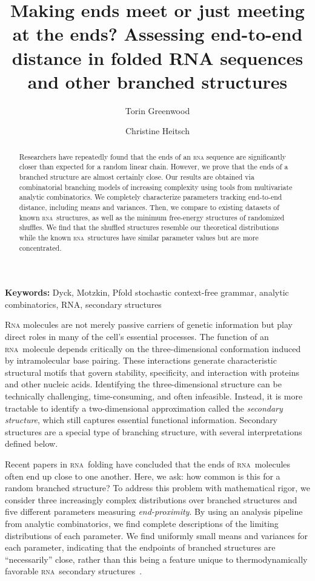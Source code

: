 \documentclass{article}
\title{Making ends meet or just meeting at the ends?  Assessing end-to-end distance in folded RNA sequences and other branched structures}
\author[1]{Torin Greenwood}
\author[2]{Christine Heitsch}
\affil[1]{Department of Mathematics, North Dakota State University, Fargo, ND 58102, USA}
\affil[2]{School of Mathematics, Georgia Institute of Technology, Atlanta, GA 30332, USA}
\date{}
\newcommand{\RNA}{\textsc{rna}}
\newcommand{\rna}{\textsc{rna}}
\newcommand{\keywords}[1]{%
  \par\medskip\noindent\textbf{Keywords:} #1\par\medskip
}
\begin{document}
\maketitle

\begin{abstract}
Researchers have repeatedly found that the ends of an \textsc{rna} sequence are significantly closer than expected for a random linear chain.  However, we prove that the ends of a branched structure are almost certainly close.  Our results are obtained via combinatorial branching models of increasing complexity using tools from multivariate analytic combinatorics.  We completely characterize parameters tracking end-to-end distance, including means and variances.  Then, we compare to existing datasets of known \rna\ structures, as well as the minimum free-energy structures of randomized shuffles.  We find that the shuffled structures resemble our theoretical distributions while the known \rna\ structures have similar parameter values but are more concentrated.
\end{abstract}

\keywords{Dyck, Motzkin, Pfold stochastic context-free grammar, analytic combinatorics, RNA, secondary structures}


\textsc{Rna} molecules are not merely passive carriers of genetic information but play direct roles in many of the cell’s essential processes. The function of an \RNA\ molecule depends critically on the three-dimensional conformation induced by intramolecular base pairing.  These interactions generate characteristic structural motifs that govern stability, specificity, and interaction with proteins and other nucleic acids.  Identifying the three-dimensional structure can be technically challenging, time-consuming, and often infeasible.  Instead, it is more tractable to identify a two-dimensional approximation called the \emph{secondary structure}, which still captures essential functional information.  Secondary structures are a special type of branching structure, with several interpretations defined below.  

Recent papers in \rna\ folding have concluded that the ends of \rna\ molecules often end up close to one another.  Here, we ask: how common is this for a random branched structure?  To address this problem with mathematical rigor, we consider three increasingly complex distributions over branched structures and five different parameters measuring \emph{end-proximity}.  By using an analysis pipeline from analytic combinatorics, we find complete descriptions of the limiting distributions of each parameter.  We find uniformly small means and variances for each parameter, indicating that the endpoints of branched structures are ``necessarily'' close, rather than this being a feature unique to thermodynamically favorable \rna\ secondary structures~\cite{Yoffe:2010}.
\end{document}
